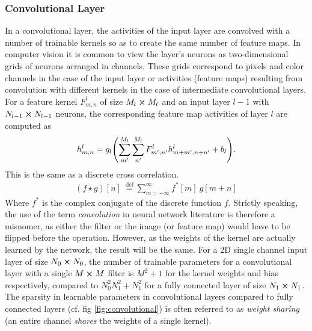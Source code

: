 \subsubsection{Convolutional Layer}
In a convolutional layer, the activities of the input layer are convolved with a number of trainable kernels so as to create the same number of feature maps. In computer vision it is common to view the layer's neurons as two-dimensional grids of neurons arranged in channels. These grids correspond to pixels and color channels in the case of the input layer or activities (feature maps) resulting from convolution with different kernels in the case of intermediate convolutional layers. For a feature kernel $F_{m,n}^l$ of size $M_l\cp M_l$ and an input layer $l-1$ with $N_{l-1}\cp N_{l-1}$ neurons, the corresponding feature map activities of layer $l$ are computed as
\begin{align}
    h^l_{m,n} = g_l\qty(\sum_{m'}^{M_l}\sum_{n'}^{M_l}F_{m',n'}^l h_{m+m',n+n'}^l+b_l).
\end{align}
This is the same as a discrete cross correlation.
\begin{align}
    (f \star g)[n]\ \stackrel{\mathrm{def}}{=} \sum_{m=-\infty}^{\infty} f^*[m]\ g[m+n]
\end{align}
Where $f^*$ is the complex conjugate of the discrete function $f$. Strictly speaking, the use of the term \emph{convolution} in neural network literature is therefore a misnomer, as either the filter or the image (or feature map) would have to be flipped before the operation. However, as the weights of the kernel are actually learned by the network, the result will be the same. For a 2D single channel input layer of size $N_0\cp N_0$, the number of trainable parameters for a convolutional layer with a single $M\cp M$ filter is $M^2 + 1$ for the kernel weights and bias respectively, compared to $N_0^2N_1^2+N_1^2$ for a fully connected layer of size $N_1\cp N_1$. The sparsity in learnable parameters in convolutional layers compared to fully connected layers (cf. fig \ref{fig:convolutional}) is often referred to as \emph{weight sharing} (an entire channel \emph{shares} the weights of a single kernel).
